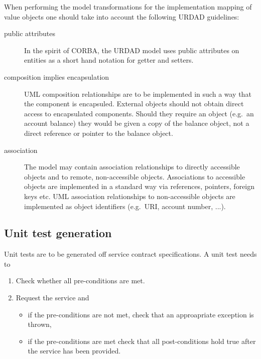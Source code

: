 When performing the model transformations for the implementation mapping of value objects one should
take into account the following URDAD guidelines:
\begin{description}
  \item[public attributes] In the spirit of CORBA, the URDAD model uses public attributes on entities as a short
	 hand notation for getter and setters.
  \item[composition implies encapsulation] UML composition relationships are to be implemented in such a way that
the component is encapsuled. External objects should not obtain direct access to encapsulated components. Should
they require an object (e.g.\ an account balance) they would be given a copy of the balance object, not a direct reference
or pointer to the balance object.
  \item[association] The model may contain association relationships to directly accessible objects and to remote, 
non-accessible objects. Associations to accessible objects are implemented in a standard way via references, pointers,
foreign keys etc. UML association relationships to non-accessible objects are implemented as object identifiers
 (e.g.\ URI, account number, ...).
\end{description}


\subsection{Unit test generation}
Unit tests are to be generated off service contract specifications. A unit test needs to 
 
  \begin{enumerate}
	 \item Check whether all pre-conditions are met.
	 \item Request the service and
		\begin{itemize}
		  \item if the pre-conditions are not met, check that an approapriate exception is thrown,
		  \item if the pre-conditions are met check that all post-conditions hold true after the service has been provided.
		\end{itemize}
  \end{enumerate}


